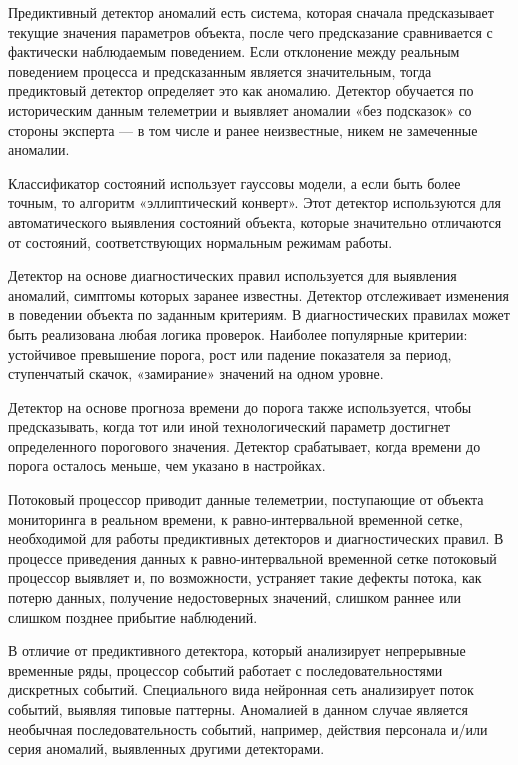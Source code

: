 Предиктивный детектор аномалий есть система, которая сначала предсказывает текущие значения параметров объекта, после чего предсказание сравнивается с фактически наблюдаемым поведением. Если отклонение между реальным поведением процесса и предсказанным является значительным, тогда предиктовый детектор определяет это как аномалию. Детектор обучается по историческим данным телеметрии и выявляет аномалии «без подсказок» со стороны эксперта — в том числе и ранее неизвестные, никем не замеченные аномалии.

Классификатор состояний использует гауссовы модели, а если быть более точным, то алгоритм «эллиптический конверт». Этот детектор используются для автоматического выявления состояний объекта, которые значительно отличаются от состояний, соответствующих нормальным режимам работы.

Детектор на основе диагностических правил используется для выявления аномалий, симптомы которых заранее известны. Детектор отслеживает изменения в поведении объекта по заданным критериям. В диагностических правилах может быть реализована любая логика проверок. Наиболее популярные критерии: устойчивое превышение порога, рост или падение показателя за период, ступенчатый скачок, «замирание» значений на одном уровне.

Детектор на основе прогноза времени до порога также используется, чтобы предсказывать, когда тот или иной технологический параметр достигнет определенного порогового значения. Детектор срабатывает, когда времени до порога осталось меньше, чем указано в настройках.

Потоковый процессор приводит данные телеметрии, поступающие от объекта мониторинга в реальном времени, к равно-интервальной временной сетке, необходимой для работы предиктивных детекторов и диагностических правил. В процессе приведения данных к равно-интервальной временной сетке потоковый процессор выявляет и, по возможности, устраняет такие дефекты потока, как потерю данных, получение недостоверных значений, слишком раннее или слишком позднее прибытие наблюдений.

В отличие от предиктивного детектора, который анализирует непрерывные временные ряды, процессор событий работает с последовательностями дискретных событий. Специального вида нейронная сеть анализирует поток событий, выявляя типовые паттерны. Аномалией в данном случае является необычная последовательность событий, например, действия персонала и/или серия аномалий, выявленных другими детекторами.

